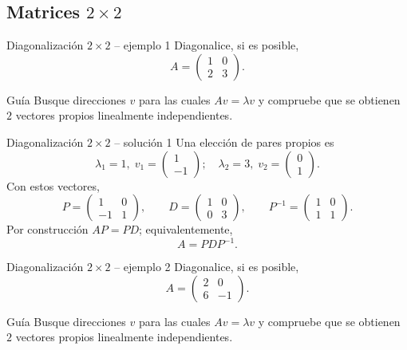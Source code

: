 \documentclass[aspectratio=169,10pt]{beamer}
\begin{document}
\subsection{Matrices $2\times 2$}
\begin{frame}{Diagonalización $2\times 2$ -- ejemplo 1}
\small
Diagonalice, si es posible,
\[
A=\begin{pmatrix}1 & 0\\2 & 3\end{pmatrix}.
\]
\begin{block}{Guía}
Busque direcciones $v$ para las cuales $Av=\lambda v$ y compruebe que se obtienen $2$ vectores propios linealmente independientes.
\end{block}
\end{frame}
\begin{frame}{Diagonalización $2\times 2$ -- solución 1}
\scriptsize
Una elección de pares propios es
\[
\lambda_1=1,\;v_1=\begin{pmatrix}1\\-1\end{pmatrix};\quad \lambda_2=3,\;v_2=\begin{pmatrix}0\\1\end{pmatrix}.
\]
Con estos vectores,
\[
P=\begin{pmatrix}1 & 0\\-1 & 1\end{pmatrix},\qquad D=\begin{pmatrix}1 & 0\\0 & 3\end{pmatrix},\qquad P^{-1}=\begin{pmatrix}1 & 0\\1 & 1\end{pmatrix}.
\]
Por construcción $AP=PD$; equivalentemente,
\[
\boxed{A=PDP^{-1}}.
\]
\end{frame}
\begin{frame}{Diagonalización $2\times 2$ -- ejemplo 2}
\small
Diagonalice, si es posible,
\[
A=\begin{pmatrix}2 & 0\\6 & -1\end{pmatrix}.
\]
\begin{block}{Guía}
Busque direcciones $v$ para las cuales $Av=\lambda v$ y compruebe que se obtienen $2$ vectores propios linealmente independientes.
\end{block}
\end{frame}
\end{document}
